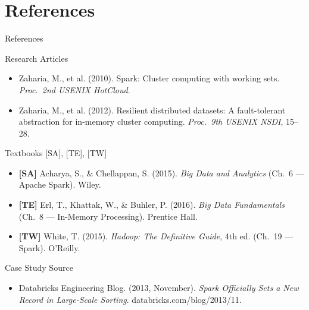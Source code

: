\documentclass[aspectratio=169,10pt]{beamer}
\begin{document}
\section*{References}

\begin{frame}{References}
  \begin{block}{Research Articles}
    \begin{itemize}
      \item Zaharia, M., et al. (2010).
            Spark: Cluster computing with working sets.
            \textit{Proc.\ 2nd USENIX HotCloud}.
      \item Zaharia, M., et al. (2012).
            Resilient distributed datasets: A fault-tolerant abstraction
            for in-memory cluster computing.
            \textit{Proc.\ 9th USENIX NSDI}, 15--28.
    \end{itemize}
  \end{block}
  \vspace{4pt}
  \begin{block}{Textbooks \textmd{[SA], [TE], [TW]}}
    \begin{itemize}
      \item \textbf{[SA]} Acharya, S., \& Chellappan, S. (2015).
            \textit{Big Data and Analytics}
            (Ch.~6 — Apache Spark). Wiley.
      \item \textbf{[TE]} Erl, T., Khattak, W., \& Buhler, P. (2016).
            \textit{Big Data Fundamentals}
            (Ch.~8 — In-Memory Processing). Prentice Hall.
      \item \textbf{[TW]} White, T. (2015).
            \textit{Hadoop: The Definitive Guide}, 4th ed.
            (Ch.~19 — Spark). O'Reilly.
    \end{itemize}
  \end{block}
  \vspace{4pt}
  \begin{block}{Case Study Source}
    \begin{itemize}
      \item Databricks Engineering Blog. (2013, November).
            \textit{Spark Officially Sets a New Record in Large-Scale
            Sorting}. databricks.com/blog/2013/11.
    \end{itemize}
  \end{block}
\end{frame}
\end{document}
